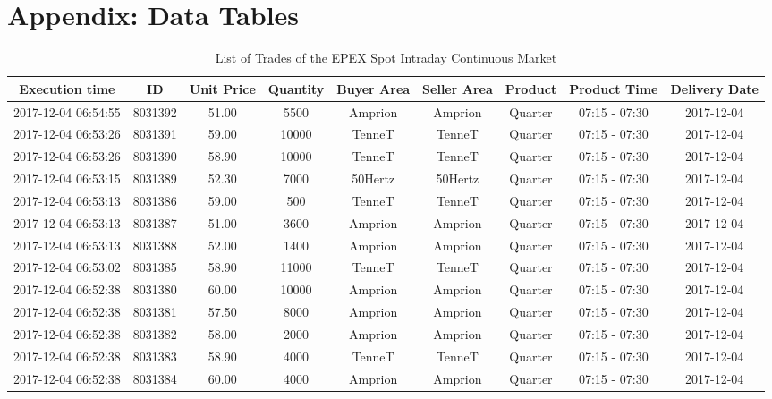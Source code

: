 \documentclass[a4paper, 12pt]{article}
\begin{document}
\clearpage
\appendix
\section{Appendix: Data Tables \label{app-data-tables}}
\label{sec:orgcb86899}
\renewcommand\thetable{\thesection.\arabic{table}}
\setcounter{table}{0}

{\captionsetup[table]{aboveskip=0.5cm}
\begin{table}
\caption{List of Trades of the EPEX Spot Intraday Continuous Market}
\centering
\begin{tabular}{c|cccccccc}
\hline
\hline
Execution time & ID & Unit Price & Quantity & Buyer Area & Seller Area & Product & Product Time & Delivery Date\\
\hline
2017-12-04 06:54:55 & 8031392 & 51.00 & 5500 & Amprion & Amprion & Quarter & 07:15 - 07:30 & 2017-12-04\\
2017-12-04 06:53:26 & 8031391 & 59.00 & 10000 & TenneT & TenneT & Quarter & 07:15 - 07:30 & 2017-12-04\\
2017-12-04 06:53:26 & 8031390 & 58.90 & 10000 & TenneT & TenneT & Quarter & 07:15 - 07:30 & 2017-12-04\\
2017-12-04 06:53:15 & 8031389 & 52.30 & 7000 & 50Hertz & 50Hertz & Quarter & 07:15 - 07:30 & 2017-12-04\\
2017-12-04 06:53:13 & 8031386 & 59.00 & 500 & TenneT & TenneT & Quarter & 07:15 - 07:30 & 2017-12-04\\
2017-12-04 06:53:13 & 8031387 & 51.00 & 3600 & Amprion & Amprion & Quarter & 07:15 - 07:30 & 2017-12-04\\
2017-12-04 06:53:13 & 8031388 & 52.00 & 1400 & Amprion & Amprion & Quarter & 07:15 - 07:30 & 2017-12-04\\
2017-12-04 06:53:02 & 8031385 & 58.90 & 11000 & TenneT & TenneT & Quarter & 07:15 - 07:30 & 2017-12-04\\
2017-12-04 06:52:38 & 8031380 & 60.00 & 10000 & Amprion & Amprion & Quarter & 07:15 - 07:30 & 2017-12-04\\
2017-12-04 06:52:38 & 8031381 & 57.50 & 8000 & Amprion & Amprion & Quarter & 07:15 - 07:30 & 2017-12-04\\
2017-12-04 06:52:38 & 8031382 & 58.00 & 2000 & Amprion & Amprion & Quarter & 07:15 - 07:30 & 2017-12-04\\
2017-12-04 06:52:38 & 8031383 & 58.90 & 4000 & TenneT & TenneT & Quarter & 07:15 - 07:30 & 2017-12-04\\
2017-12-04 06:52:38 & 8031384 & 60.00 & 4000 & Amprion & Amprion & Quarter & 07:15 - 07:30 & 2017-12-04\\

\end{tabular}
\end{table}}
\end{document}

